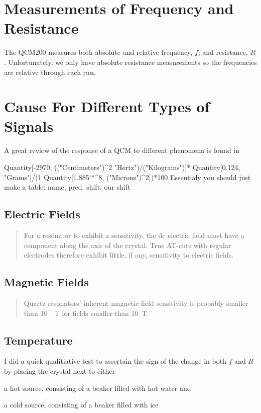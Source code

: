 \documentclass[a4paper]{article}
\begin{document}
\section{Measurements of Frequency and Resistance}
The QCM200 measures both absolute and relative frequency, $f$, and
resistance, $R$.  Unfortunately, we only have absolute resistance
measurements so the frequencies are relative through each run.

\section{Cause For Different Types of Signals}
A great review of the response of a QCM to different phenomena is found in \cite{walls1995fundamental}

Quantity[-2970, (("Centimeters")^2 "Hertz")/("Kilograms")]*
 Quantity[0.124, "Grams"]/(1 Quantity[1.885`*^8, ("Microns")^2])*100
Essentialy you should just make a table: name, pred. shift, our shift
\subsection{Electric Fields}
\begin{quote}
For a resonator to exhibit a sensitivity, the dc electric field must have a
component along the axis of the crystal. True AT-cuts with regular electrodes
therefore exhibit little, if any, sensitivity to electric fields. \cite{walls1995fundamental}
\end{quote}
\subsection{Magnetic Fields}
\begin{quote}
Quartz resonators’ inherent magnetic field sensitivity is
probably smaller than \SI{10}{\per\tesla} for fields smaller than \SI{10}{\tesla}. \cite{walls1995fundamental}
\end{quote}
 

\subsection{Temperature}
I did a quick qualitiative test to assertain the sign of the change in both
$f$ and $R$ by placing the crystal next to either 
\begin{inparaenum}
 \item a hot source, consisting of a beaker filled with hot water and 
 \item a cold source, consisting of a beaker filled with ice
\end{inparaenum}
\end{document}
